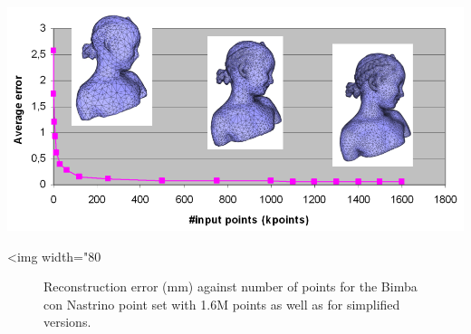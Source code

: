 \begin{center}
    \begin{ccTexOnly}
        \includegraphics[width=1.0\textwidth]{Surface_reconstruction_points_3/simplification_bench}
    \end{ccTexOnly}
    \begin{ccHtmlOnly}
        <img width="80%
    \end{ccHtmlOnly}
    \begin{figure}[h]
        \caption{Reconstruction error (mm) against number of points
                 for the Bimba con Nastrino point set with 1.6M points
                 as well as for simplified versions.}
        \label{Surface_reconstruction_points_3-fig-simplification_bench}
    \end{figure}
\end{center}





